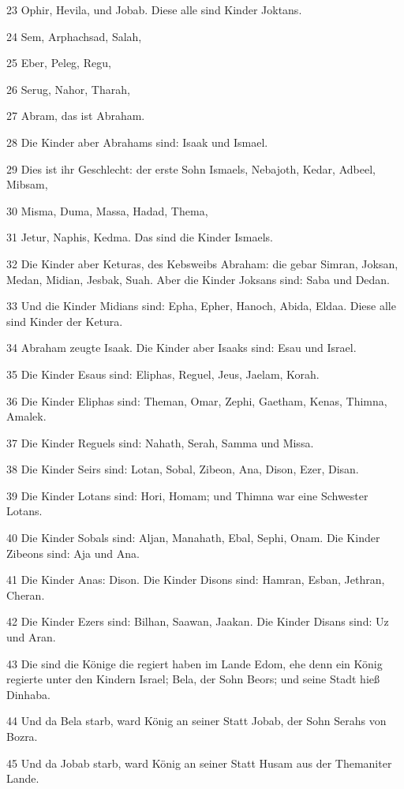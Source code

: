 \par 23 Ophir, Hevila, und Jobab. Diese alle sind Kinder Joktans.
\par 24 Sem, Arphachsad, Salah,
\par 25 Eber, Peleg, Regu,
\par 26 Serug, Nahor, Tharah,
\par 27 Abram, das ist Abraham.
\par 28 Die Kinder aber Abrahams sind: Isaak und Ismael.
\par 29 Dies ist ihr Geschlecht: der erste Sohn Ismaels, Nebajoth, Kedar, Adbeel, Mibsam,
\par 30 Misma, Duma, Massa, Hadad, Thema,
\par 31 Jetur, Naphis, Kedma. Das sind die Kinder Ismaels.
\par 32 Die Kinder aber Keturas, des Kebsweibs Abraham: die gebar Simran, Joksan, Medan, Midian, Jesbak, Suah. Aber die Kinder Joksans sind: Saba und Dedan.
\par 33 Und die Kinder Midians sind: Epha, Epher, Hanoch, Abida, Eldaa. Diese alle sind Kinder der Ketura.
\par 34 Abraham zeugte Isaak. Die Kinder aber Isaaks sind: Esau und Israel.
\par 35 Die Kinder Esaus sind: Eliphas, Reguel, Jeus, Jaelam, Korah.
\par 36 Die Kinder Eliphas sind: Theman, Omar, Zephi, Gaetham, Kenas, Thimna, Amalek.
\par 37 Die Kinder Reguels sind: Nahath, Serah, Samma und Missa.
\par 38 Die Kinder Seirs sind: Lotan, Sobal, Zibeon, Ana, Dison, Ezer, Disan.
\par 39 Die Kinder Lotans sind: Hori, Homam; und Thimna war eine Schwester Lotans.
\par 40 Die Kinder Sobals sind: Aljan, Manahath, Ebal, Sephi, Onam. Die Kinder Zibeons sind: Aja und Ana.
\par 41 Die Kinder Anas: Dison. Die Kinder Disons sind: Hamran, Esban, Jethran, Cheran.
\par 42 Die Kinder Ezers sind: Bilhan, Saawan, Jaakan. Die Kinder Disans sind: Uz und Aran.
\par 43 Die sind die Könige die regiert haben im Lande Edom, ehe denn ein König regierte unter den Kindern Israel; Bela, der Sohn Beors; und seine Stadt hieß Dinhaba.
\par 44 Und da Bela starb, ward König an seiner Statt Jobab, der Sohn Serahs von Bozra.
\par 45 Und da Jobab starb, ward König an seiner Statt Husam aus der Themaniter Lande.
